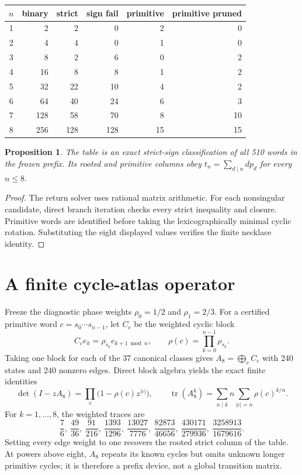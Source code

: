 \documentclass[10pt]{article}
\newtheorem{proposition}{Proposition}
\begin{document}
\begin{center}
\small
\begin{tabular}{c@{\quad}rrrrr}
\toprule
$n$ & binary & strict & sign fail & primitive & primitive pruned\\
\midrule
1&2&2&0&2&0\\
2&4&4&0&1&0\\
3&8&2&6&0&2\\
4&16&8&8&1&2\\
5&32&22&10&4&2\\
6&64&40&24&6&3\\
7&128&58&70&8&10\\
8&256&128&128&15&15\\
\bottomrule
\end{tabular}
\end{center}

\begin{proposition}
The table is an exact strict-sign classification of all 510 words in the
frozen prefix.  Its rooted and primitive columns obey
$t_n=\sum_{d\mid n}d p_d$ for every $n\leq8$.
\end{proposition}
\begin{proof}
The return solver uses rational matrix arithmetic.  For each nonsingular
candidate, direct branch iteration checks every strict inequality and closure.
Primitive words are identified before taking the lexicographically minimal
cyclic rotation.  Substituting the eight displayed values verifies the finite
necklace identity.
\end{proof}

\section{A finite cycle-atlas operator}
Freeze the diagnostic phase weights $\rho_0=1/2$ and $\rho_1=2/3$.  For a
certified primitive word $c=s_0\cdots s_{n-1}$, let $C_c$ be the weighted
cyclic block
\[
 C_c e_k=\rho_{s_k}e_{k+1\bmod n},\qquad
 \rho(c)=\prod_{k=0}^{n-1}\rho_{s_k}.
\]
Taking one block for each of the 37 canonical classes gives
$A_8=\bigoplus_c C_c$ with 240 states and 240 nonzero edges.  Direct block
algebra yields the exact finite identities
\[
 \det(I-zA_8)=\prod_c\bigl(1-\rho(c)z^{|c|}\bigr),\qquad
 \operatorname{tr}(A_8^k)=
 \sum_{n\mid k}n\!\sum_{|c|=n}\rho(c)^{k/n}.
\]
For $k=1,\ldots,8$, the weighted traces are
\[
 \frac76,\ \frac{49}{36},\ \frac{91}{216},\ \frac{1393}{1296},\
 \frac{13027}{7776},\ \frac{82873}{46656},\
 \frac{430171}{279936},\ \frac{3258913}{1679616}.
\]
Setting every edge weight to one recovers the rooted strict column of the
table.  At powers above eight, $A_8$ repeats its known cycles but omits
unknown longer primitive cycles; it is therefore a prefix device, not a
global transition matrix.
\end{document}
